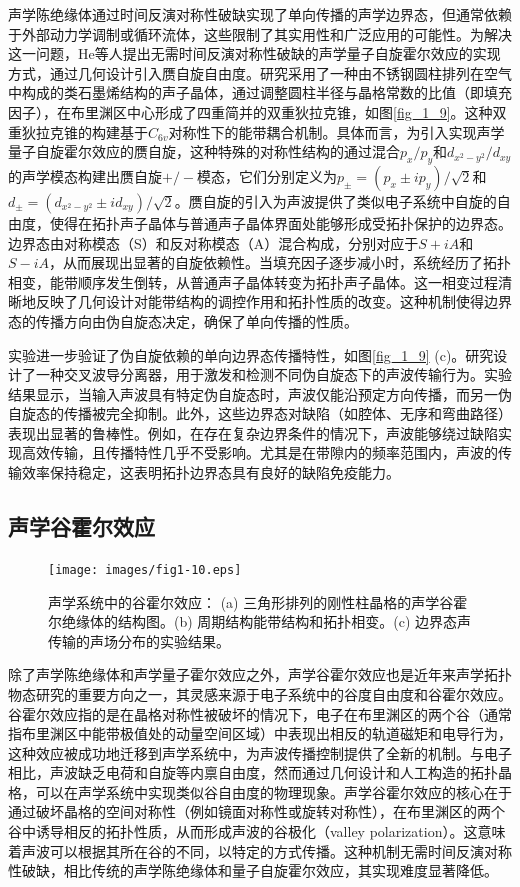 声学陈绝缘体通过时间反演对称性破缺实现了单向传播的声学边界态，但通常依赖于外部动力学调制或循环流体，这些限制了其实用性和广泛应用的可能性。为解决这一问题，He等人提出无需时间反演对称性破缺的声学量子自旋霍尔效应的实现方式，通过几何设计引入赝自旋自由度\cite{i2}。研究采用了一种由不锈钢圆柱排列在空气中构成的类石墨烯结构的声子晶体，通过调整圆柱半径与晶格常数的比值（即填充因子），在布里渊区中心形成了四重简并的双重狄拉克锥，如图\ref{fig_1_9}。这种双重狄拉克锥的构建基于$C_{6v}$对称性下的能带耦合机制。具体而言，为引入实现声学量子自旋霍尔效应的赝自旋，这种特殊的对称性结构的通过混合$p_x/p_y$和$d_{x^2-y^2}/d_{xy}$的声学模态构建出赝自旋$+/-$模态，它们分别定义为$p_{\pm} = (p_x\pm ip_y)/\sqrt{2}$和$d_{\pm} = (d_{x^2-y^2}\pm id_{xy})/\sqrt{2}$。赝自旋的引入为声波提供了类似电子系统中自旋的自由度，使得在拓扑声子晶体与普通声子晶体界面处能够形成受拓扑保护的边界态。边界态由对称模态（S）和反对称模态（A）混合构成，分别对应于$S+iA$和$S-iA$，从而展现出显著的自旋依赖性。当填充因子逐步减小时，系统经历了拓扑相变，能带顺序发生倒转，从普通声子晶体转变为拓扑声子晶体。这一相变过程清晰地反映了几何设计对能带结构的调控作用和拓扑性质的改变。这种机制使得边界态的传播方向由伪自旋态决定，确保了单向传播的性质。

实验进一步验证了伪自旋依赖的单向边界态传播特性，如图\ref{fig_1_9} (c)。研究设计了一种交叉波导分离器，用于激发和检测不同伪自旋态下的声波传输行为。实验结果显示，当输入声波具有特定伪自旋态时，声波仅能沿预定方向传播，而另一伪自旋态的传播被完全抑制。此外，这些边界态对缺陷（如腔体、无序和弯曲路径）表现出显著的鲁棒性。例如，在存在复杂边界条件的情况下，声波能够绕过缺陷实现高效传输，且传播特性几乎不受影响。尤其是在带隙内的频率范围内，声波的传输效率保持稳定，这表明拓扑边界态具有良好的缺陷免疫能力。

\subsection{声学谷霍尔效应}

\begin{figure}[h!]
    \centering
    \texttt{[image: images/fig1-10.eps]} 
    \caption{声学系统中的谷霍尔效应\cite{i3}：
    (a) 三角形排列的刚性柱晶格的声学谷霍尔绝缘体的结构图。(b) 周期结构能带结构和拓扑相变。(c) 边界态声传输的声场分布的实验结果。
    }
    \label{fig_1_10}
\end{figure}

除了声学陈绝缘体和声学量子霍尔效应之外，声学谷霍尔效应也是近年来声学拓扑物态研究的重要方向之一，其灵感来源于电子系统中的谷度自由度和谷霍尔效应。谷霍尔效应指的是在晶格对称性被破坏的情况下，电子在布里渊区的两个谷（通常指布里渊区中能带极值处的动量空间区域）中表现出相反的轨道磁矩和电导行为，这种效应被成功地迁移到声学系统中，为声波传播控制提供了全新的机制。与电子相比，声波缺乏电荷和自旋等内禀自由度，然而通过几何设计和人工构造的拓扑晶格，可以在声学系统中实现类似谷自由度的物理现象。声学谷霍尔效应的核心在于通过破坏晶格的空间对称性（例如镜面对称性或旋转对称性），在布里渊区的两个谷中诱导相反的拓扑性质，从而形成声波的谷极化（valley polarization）。这意味着声波可以根据其所在谷的不同，以特定的方式传播。这种机制无需时间反演对称性破缺，相比传统的声学陈绝缘体和量子自旋霍尔效应，其实现难度显著降低。

